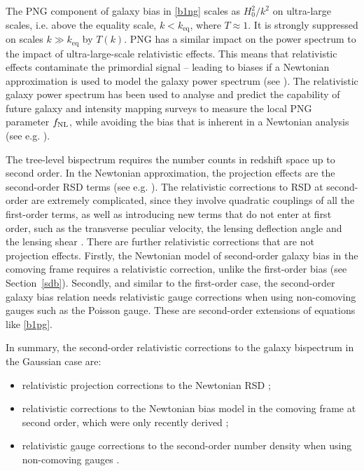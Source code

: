 {The PNG component of galaxy bias in \eqref{b1ng} 
scales as $H_0^2/k^2$ on ultra-large scales, i.e. above the equality scale, $k< k_{\mathrm{eq}}$, where $T\approx 1$. It
is strongly suppressed on scales $k\gg k_{\mathrm{eq}}$ by $T(k)$. PNG has a similar impact on the power spectrum to the impact of ultra-large-scale relativistic effects. This means that relativistic effects contaminate the primordial signal --  leading to  biases if a Newtonian approximation is used to model the galaxy power spectrum (see \cite{Bruni:2011ta, Jeong:2011as, Camera:2014sba}). 
The relativistic galaxy power spectrum has been used to analyse and predict the capability of future galaxy and intensity mapping surveys to
measure the local PNG parameter $f_\text{NL}$, while avoiding the bias  that is inherent in a Newtonian analysis (see e.g. \cite{Bruni:2011ta, Jeong:2011as, LopezHonorez:2011cy, Yoo:2012se, Raccanelli:2013dza,Camera:2014bwa, Camera:2014sba, Raccanelli:2015vla, Alonso:2015uua, Alonso:2015sfa, Fonseca:2015laa, Fonseca:2016xvi, Abramo:2017xnp, Lorenz:2017iez, Fonseca:2018hsu, Ballardini:2019wxj, Grimm:2020ays, Bernal:2020pwq, Wang:2020ibf}).  

The tree-level bispectrum requires the number counts
in redshift space up to second order.
In the Newtonian approximation, the projection effects are the second-order RSD terms (see e.g. \cite{Tellarini:2016sgp}). The relativistic corrections
 to RSD at second-order  are extremely complicated, since they involve quadratic couplings of all the first-order terms, as well as introducing new terms that do not enter at first order, such as the {transverse peculiar velocity}, the lensing deflection angle and the lensing shear  \cite{Bertacca:2014dra, Bertacca:2014wga, Yoo:2014sfa, DiDio:2014lka, Bertacca:2014hwa}.   {There are further relativistic corrections that are not projection effects. Firstly,
 the Newtonian model of second-order galaxy bias in the comoving frame requires a relativistic correction, unlike the first-order bias (see Section~\ref{sdb}). Secondly,
 and similar to the first-order case, the second-order galaxy bias relation needs  relativistic gauge corrections  when using non-comoving gauges such as the Poisson gauge. These are second-order extensions of equations like \eqref{b1pg}.}  
{In summary, the second-order relativistic corrections to the galaxy bispectrum in the Gaussian case are: 
\begin{itemize}
\item
relativistic projection corrections to the Newtonian RSD  \cite{Bertacca:2014dra, Bertacca:2014wga, Yoo:2014sfa, DiDio:2014lka, Bertacca:2014hwa};
\item
relativistic corrections to the Newtonian bias model in the comoving frame at second order, which were only recently derived  \cite{Umeh:2019qyd, Umeh:2019jqg};
\item  
 relativistic gauge corrections to the second-order number density when using non-comoving gauges   \cite{Bertacca:2014dra, Bertacca:2014wga}. 
 \end{itemize}}

}
